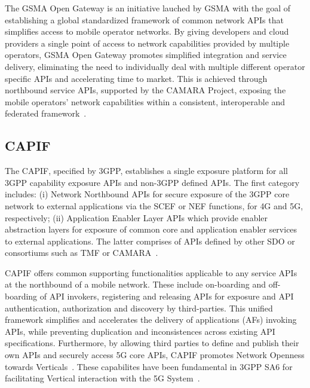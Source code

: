 
The \acs{GSMA} Open Gateway is an initiative lauched by \ac{GSMA} with the goal of establishing a global standardized framework of common network \acsp{API} that simplifies access to mobile operator networks. By giving developers and cloud providers a single point of access to network capabilities provided by multiple operators, \acs{GSMA} Open Gateway promotes simplified integration and service delivery, eliminating the need to individually deal with multiple different operator specific \acsp{API} and accelerating time to market. This is achieved through northbound service \acsp{API}, supported by the CAMARA Project, exposing the mobile operators' network capabilities within a consistent, interoperable and federated framework~\citep{gsmaGSMA,telefonicaGSMA}.


\subsection{CAPIF} \label{sota:initiatives:CAPIF}




The \acf{CAPIF}, specified by \ac{3GPP}, establishes a single exposure platform for all \ac{3GPP} capability exposure \acsp{API} and non-\ac{3GPP} defined \acsp{API}. The first category includes: (i) Network Northbound \acsp{API} for secure exposure of the \ac{3GPP} core network to external applications via the \ac{SCEF} or \ac{NEF} functions, for \ac{4G} and \ac{5G}, respectively; (ii) Application Enabler Layer \acsp{API} which provide enabler abstraction layers for exposure of common core and application enabler services to external applications. The latter comprises of \acsp{API} defined by other \acs{SDO} or consortiums such as \acs{TMF} or CAMARA~\cite{CapabilityExposure3GPP}. %

\acs{CAPIF} offers common supporting functionalities applicable to any service \acsp{API} at the northbound of a mobile network. These include on-boarding and off-boarding of \acs{API} invokers, registering and releasing \acsp{API} for exposure and \acs{API} authentication, authorization and discovery by third-parties. This unified framework simplifies and accelerates the delivery of applications (\acp{AF}) invoking \acsp{API}, while preventing duplication and inconsistences across existing \acs{API} specifications. Furthermore, by allowing third parties to define and publish their own \acsp{API} and securely access \acs{5G} core \acsp{API}, \acs{CAPIF} promotes Network Openness towards Verticals~\cite{CAPIFmicroserviceVerticals}. These capabilites have been fundamental in \acs{3GPP} SA6 for facilitating Vertical interaction with the \acs{5G} System~\cite{CAPIFSA6}.

